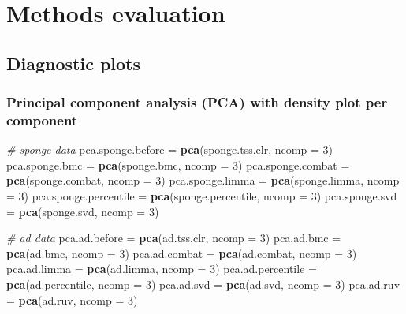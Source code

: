 \documentclass[]{book}
\newenvironment{Shaded}{\begin{snugshade}}{\end{snugshade}}
\newcommand{\KeywordTok}[1]{\textcolor[rgb]{0.13,0.29,0.53}{\textbf{#1}}}
\newcommand{\DataTypeTok}[1]{\textcolor[rgb]{0.13,0.29,0.53}{#1}}
\newcommand{\DecValTok}[1]{\textcolor[rgb]{0.00,0.00,0.81}{#1}}
\newcommand{\StringTok}[1]{\textcolor[rgb]{0.31,0.60,0.02}{#1}}
\newcommand{\CommentTok}[1]{\textcolor[rgb]{0.56,0.35,0.01}{\textit{#1}}}
\newcommand{\NormalTok}[1]{#1}
\begin{document}
\chapter{Methods evaluation}\label{eval}

\section{Diagnostic plots}\label{diagnostic-plots}

\subsection{Principal component analysis (PCA) with density plot per
component}\label{principal-component-analysis-pca-with-density-plot-per-component-1}

\begin{Shaded}
\begin{Highlighting}[]
\CommentTok{# sponge data}
\NormalTok{pca.sponge.before =}\StringTok{ }\KeywordTok{pca}\NormalTok{(sponge.tss.clr, }\DataTypeTok{ncomp =} \DecValTok{3}\NormalTok{)}
\NormalTok{pca.sponge.bmc =}\StringTok{ }\KeywordTok{pca}\NormalTok{(sponge.bmc, }\DataTypeTok{ncomp =} \DecValTok{3}\NormalTok{)}
\NormalTok{pca.sponge.combat =}\StringTok{ }\KeywordTok{pca}\NormalTok{(sponge.combat, }\DataTypeTok{ncomp =} \DecValTok{3}\NormalTok{)}
\NormalTok{pca.sponge.limma =}\StringTok{ }\KeywordTok{pca}\NormalTok{(sponge.limma, }\DataTypeTok{ncomp =} \DecValTok{3}\NormalTok{)}
\NormalTok{pca.sponge.percentile =}\StringTok{ }\KeywordTok{pca}\NormalTok{(sponge.percentile, }\DataTypeTok{ncomp =} \DecValTok{3}\NormalTok{)}
\NormalTok{pca.sponge.svd =}\StringTok{ }\KeywordTok{pca}\NormalTok{(sponge.svd, }\DataTypeTok{ncomp =} \DecValTok{3}\NormalTok{)}

\CommentTok{# ad data}
\NormalTok{pca.ad.before =}\StringTok{ }\KeywordTok{pca}\NormalTok{(ad.tss.clr, }\DataTypeTok{ncomp =} \DecValTok{3}\NormalTok{)}
\NormalTok{pca.ad.bmc =}\StringTok{ }\KeywordTok{pca}\NormalTok{(ad.bmc, }\DataTypeTok{ncomp =} \DecValTok{3}\NormalTok{)}
\NormalTok{pca.ad.combat =}\StringTok{ }\KeywordTok{pca}\NormalTok{(ad.combat, }\DataTypeTok{ncomp =} \DecValTok{3}\NormalTok{)}
\NormalTok{pca.ad.limma =}\StringTok{ }\KeywordTok{pca}\NormalTok{(ad.limma, }\DataTypeTok{ncomp =} \DecValTok{3}\NormalTok{)}
\NormalTok{pca.ad.percentile =}\StringTok{ }\KeywordTok{pca}\NormalTok{(ad.percentile, }\DataTypeTok{ncomp =} \DecValTok{3}\NormalTok{)}
\NormalTok{pca.ad.svd =}\StringTok{ }\KeywordTok{pca}\NormalTok{(ad.svd, }\DataTypeTok{ncomp =} \DecValTok{3}\NormalTok{)}
\NormalTok{pca.ad.ruv =}\StringTok{ }\KeywordTok{pca}\NormalTok{(ad.ruv, }\DataTypeTok{ncomp =} \DecValTok{3}\NormalTok{)}
\end{Highlighting}
\end{Shaded}
\end{document}
